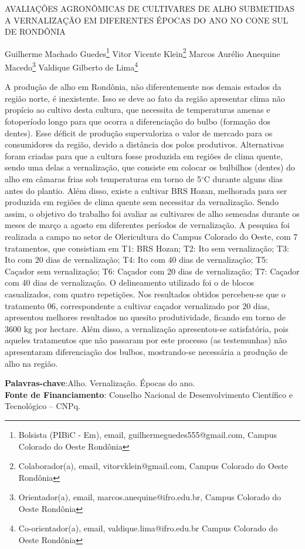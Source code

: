 \documentclass[article,12pt,onesidea,4paper,english,brazil]{abntex2}
\begin{document}
	
	
	\frenchspacing 
	
	\begin{center}
		\LARGE AVALIAÇÕES AGRONÔMICAS DE CULTIVARES DE ALHO SUBMETIDAS A
		VERNALIZAÇÃO EM DIFERENTES ÉPOCAS DO ANO NO CONE SUL DE
		RONDÔNIA
		
		\normalsize
		Guilherme Machado Guedes\footnote{Bolsista (PIBiC - Em), email, guilhermeguedes555@gmail.com, Campus Colorado do Oeste
			Rondônia} 
		Vitor Vicente Klein\footnote{Colaborador(a), email, vitorvklein@gmail.com, Campus Colorado do Oeste Rondônia} 
		Marcos Aurélio Anequine Macedo\footnote{Orientador(a), email, marcos.anequine@ifro.edu.br, Campus Colorado do Oeste Rondônia} 
	Valdique
	Gilberto de Lima\footnote{Co-orientador(a), email, valdique.lima@ifro.edu.br Campus Colorado do Oeste Rondônia} 
	\end{center}
	
	\noindent A produção de alho em Rondônia, não diferentemente nos demais estados da região
	norte, é inexistente. Isso se deve ao fato da região apresentar clima não propício ao
	cultivo desta cultura, que necessita de temperaturas amenas e fotoperíodo longo
	para que ocorra a diferenciação do bulbo (formação dos dentes). Esse déficit de
	produção supervaloriza o valor de mercado para os consumidores da região, devido
	a distância dos polos produtivos. Alternativas foram criadas para que a cultura fosse
	produzida em regiões de clima quente, sendo uma delas a vernalização, que
	consiste em colocar os bulbilhos (dentes) do alho em câmaras frias sob
	temperaturas em torno de 5$^\circ$C durante alguns dias antes do plantio. Além disso,
	existe a cultivar BRS Hozan, melhorada para ser produzida em regiões de clima
	quente sem necessitar da vernalização. Sendo assim, o objetivo do trabalho foi
	avaliar as cultivares de alho semeadas durante os meses de março a agosto em
	diferentes períodos de vernalização. A pesquisa foi realizada a campo no setor de
	Olericultura do Campus Colorado do Oeste, com 7 tratamentos, que consistiam em
	T1: BRS Hozan; T2: Ito sem vernalização; T3: Ito com 20 dias de vernalização; T4:
	Ito com 40 dias de vernalização; T5: Caçador sem vernalização; T6: Caçador com
	20 dias de vernalização; T7: Caçador com 40 dias de vernalização. O delineamento
	utilizado foi o de blocos casualizados, com quatro repetições. Nos resultados obtidos
	percebeu-se que o tratamento 06, correspondente a cultivar caçador vernalizado por
	20 dias, apresentou melhores resultados no quesito produtividade, ficando em torno
	de 3600 kg por hectare. Além disso, a vernalização apresentou-se satisfatória, pois
	aqueles tratamentos que não passaram por este processo (as testemunhas) não
	apresentaram diferenciação dos bulbos, mostrando-se necessária a produção de
	alho na região.
	
	\vspace{\onelineskip}
	
	\noindent
	\textbf{Palavras-chave}:Alho. Vernalização. Épocas do ano. \\
	\textbf{Fonte de Financiamento}: Conselho Nacional de Desenvolvimento Científico e
	Tecnológico – CNPq.
	
\end{document}
